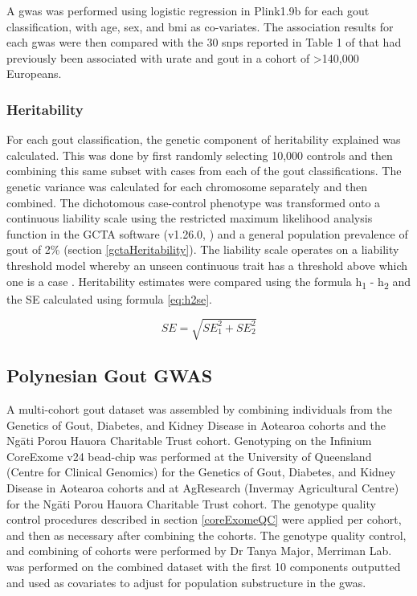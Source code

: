 \documentclass[]{report}
\newcommand{\tex}[1]{#1}
\begin{document}
A \gls{gwas} was performed using logistic regression in Plink1.9b
\citep{plink2, Chang2015} for each gout classification, with age, sex,
and \gls{bmi} as co-variates. The association results for each
\gls{gwas} were then compared with the 30 \glspl{snp} reported in Table
1 of \citet{Kottgen2013} that had previously been associated with urate
and gout in a cohort of \textgreater{}140,000 Europeans.

\subsubsection{Heritability}\label{heritability}

For each gout classification, the genetic component of heritability
explained was calculated. This was done by first randomly selecting
10,000 controls and then combining this same subset with cases from each
of the gout classifications. The genetic variance was calculated for
each chromosome separately and then combined. The dichotomous
case-control phenotype was transformed onto a continuous liability scale
using the restricted maximum likelihood analysis function in the GCTA
software (v1.26.0, \citet{Yang2011part}) and a general population
prevalence of gout of 2\% (section \ref{gctaHeritability}). The
liability scale operates on a liability threshold model whereby an
unseen continuous trait has a threshold above which one is a case
\citep{Lee2011, Zuk2012}. Heritability estimates were compared using the
formula h\textsubscript{1} - h\textsubscript{2} and the SE calculated
using formula \eqref{eq:h2se}.

\begin{equation} 
 SE = \sqrt{SE_1^2 + SE_2^2}
 \label{eq:h2se}
\end{equation}

\subsection{Polynesian Gout GWAS}\label{polynesian-gout-gwas}

A multi-cohort gout dataset was assembled by combining individuals from
the Genetics of Gout, Diabetes, and Kidney Disease in Aotearoa cohorts
and the Ng\tex{\={a}}ti Porou Hauora Charitable Trust cohort. Genotyping
on the Infinium CoreExome v24 bead-chip was performed at the University
of Queensland (Centre for Clinical Genomics) for the Genetics of Gout,
Diabetes, and Kidney Disease in Aotearoa cohorts and at AgResearch
(Invermay Agricultural Centre) for the Ng\tex{\={a}}ti Porou Hauora
Charitable Trust cohort. The genotype quality control procedures
described in section \ref{coreExomeQC} were applied per cohort, and then
as necessary after combining the cohorts. The genotype quality control,
and combining of cohorts were performed by Dr Tanya Major, Merriman Lab.
 was performed on the combined dataset with the first 10
components outputted and used as covariates to adjust for population
substructure in the \gls{gwas}.
\end{document}
